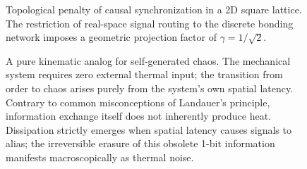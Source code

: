 \documentclass[11pt,a4paper]{article}
\begin{document}
\begin{figure}[htbp]
    \centering
    
    \caption{Topological penalty of causal synchronization in a 2D square lattice. The restriction of real-space signal routing to the discrete bonding network imposes a geometric projection factor of $\gamma = 1/\sqrt{2}$.}
    \label{fig:manhattan_routing}
\end{figure}

\begin{figure}[htbp]
    \centering
    
    \caption{A pure kinematic analog for self-generated chaos. The mechanical system requires zero external thermal input; the transition from order to chaos arises purely from the system's own spatial latency. Contrary to common misconceptions of Landauer's principle, information exchange itself does not inherently produce heat. Dissipation strictly emerges when spatial latency causes signals to alias; the irreversible erasure of this obsolete 1-bit information manifests macroscopically as thermal noise.}
    \label{fig:causal}
\end{figure}

%     
\end{document}
